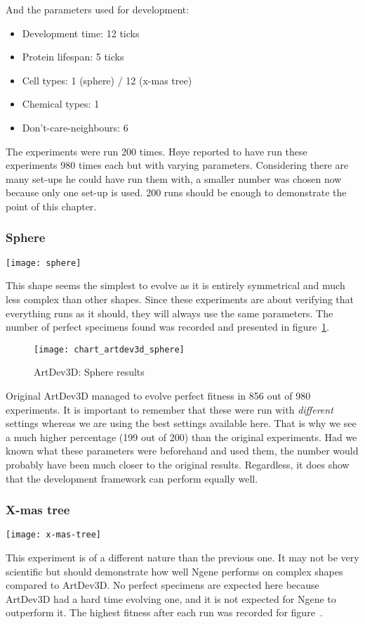 \noindent And the parameters used for development:

\begin{itemize}
	\itemsep=-2pt
	\item Development time: 12 ticks
	\item Protein lifespan: 5 ticks
	\item Cell types: 1 (sphere) / 12 (x-mas tree)
	\item Chemical types: 1
	\item Don't-care-neighbours: 6
\end{itemize}

The experiments were run 200 times. H{\o}ye reported to have run these experiments 980 times each but with varying parameters. Considering there are many set-ups he could have run them with, a smaller number was chosen now because only one set-up is used. 200 runs should be enough to demonstrate the point of this chapter.

\subsubsection{Sphere}
\begin{center}\texttt{[image: sphere]}\end{center}
This shape seems the simplest to evolve as it is entirely symmetrical and much less complex than other shapes. Since these experiments are about verifying that everything runs as it should, they will always use the same parameters. The number of perfect specimens found was recorded and presented in figure~\ref{fig:chart_artdev3d_sphere}.

\begin{figure}[!ht]
	\centering
	\texttt{[image: chart\_artdev3d\_sphere]}
	\caption{ArtDev3D: Sphere results}
	\label{fig:chart_artdev3d_sphere}
\end{figure}

Original ArtDev3D managed to evolve perfect fitness in 856 out of 980 experiments. It is important to remember that these were run with \emph{different} settings whereas we are using the best settings available here. That is why we see a much higher percentage (199 out of 200) than the original experiments. Had we known what these parameters were beforehand and used them, the number would probably have been much closer to the original results. Regardless, it does show that the development framework can perform equally well.

\subsubsection{X-mas tree}
\begin{center}\texttt{[image: x-mas-tree]}\end{center}
This experiment is of a different nature than the previous one. It may not be very scientific but should demonstrate how well Ngene performs on complex shapes compared to ArtDev3D. No perfect specimens are expected here because ArtDev3D had a hard time evolving one, and it is not expected for Ngene to outperform it. The highest fitness after each run was recorded for figure~\label{fig:chart_artdev3d_x-mas-tree}.

